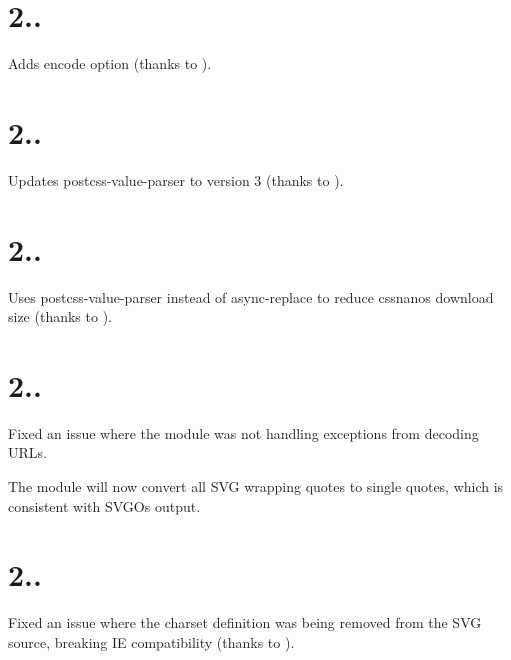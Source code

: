 \section*{2..}


\begin{DoxyItemize}
\item Adds {\ttfamily encode} option (thanks to ).
\end{DoxyItemize}

\section*{2..}


\begin{DoxyItemize}
\item Updates postcss-\/value-\/parser to version 3 (thanks to ).
\end{DoxyItemize}

\section*{2..}


\begin{DoxyItemize}
\item Uses postcss-\/value-\/parser instead of async-\/replace to reduce cssnano\textquotesingle{}s download size (thanks to ).
\end{DoxyItemize}

\section*{2..}


\begin{DoxyItemize}
\item Fixed an issue where the module was not handling exceptions from decoding U\+R\+Ls.
\item The module will now convert all S\+VG wrapping quotes to single quotes, which is consistent with S\+V\+GO\textquotesingle{}s output.
\end{DoxyItemize}

\section*{2..}


\begin{DoxyItemize}
\item Fixed an issue where the {\ttfamily charset} definition was being removed from the S\+VG source, breaking IE compatibility (thanks to ).
\end{DoxyItemize}

